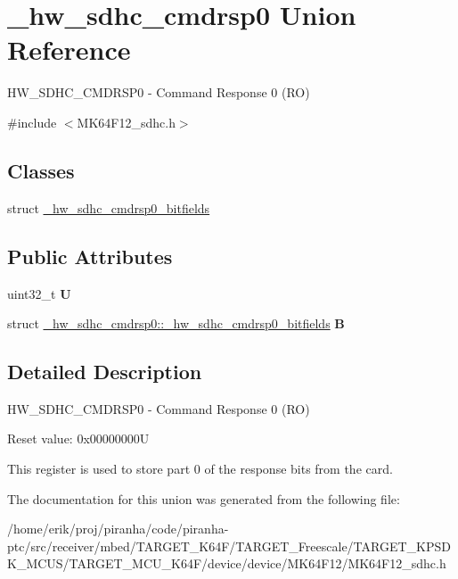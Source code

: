 \hypertarget{union__hw__sdhc__cmdrsp0}{}\section{\+\_\+hw\+\_\+sdhc\+\_\+cmdrsp0 Union Reference}
\label{union__hw__sdhc__cmdrsp0}


H\+W\+\_\+\+S\+D\+H\+C\+\_\+\+C\+M\+D\+R\+S\+P0 -\/ Command Response 0 (RO)  




{\ttfamily \#include $<$M\+K64\+F12\+\_\+sdhc.\+h$>$}

\subsection*{Classes}
\begin{DoxyCompactItemize}
\item 
struct \hyperlink{struct__hw__sdhc__cmdrsp0_1_1__hw__sdhc__cmdrsp0__bitfields}{\+\_\+hw\+\_\+sdhc\+\_\+cmdrsp0\+\_\+bitfields}
\end{DoxyCompactItemize}
\subsection*{Public Attributes}
\begin{DoxyCompactItemize}
\item 
uint32\+\_\+t {\bfseries U}\hypertarget{union__hw__sdhc__cmdrsp0_ab269572c075d2eea232217ff0bcc87f8}{}\label{union__hw__sdhc__cmdrsp0_ab269572c075d2eea232217ff0bcc87f8}

\item 
struct \hyperlink{struct__hw__sdhc__cmdrsp0_1_1__hw__sdhc__cmdrsp0__bitfields}{\+\_\+hw\+\_\+sdhc\+\_\+cmdrsp0\+::\+\_\+hw\+\_\+sdhc\+\_\+cmdrsp0\+\_\+bitfields} {\bfseries B}\hypertarget{union__hw__sdhc__cmdrsp0_a39e55bdcc375ad51350484762b3e71a4}{}\label{union__hw__sdhc__cmdrsp0_a39e55bdcc375ad51350484762b3e71a4}

\end{DoxyCompactItemize}


\subsection{Detailed Description}
H\+W\+\_\+\+S\+D\+H\+C\+\_\+\+C\+M\+D\+R\+S\+P0 -\/ Command Response 0 (RO) 

Reset value\+: 0x00000000U

This register is used to store part 0 of the response bits from the card. 

The documentation for this union was generated from the following file\+:\begin{DoxyCompactItemize}
\item 
/home/erik/proj/piranha/code/piranha-\/ptc/src/receiver/mbed/\+T\+A\+R\+G\+E\+T\+\_\+\+K64\+F/\+T\+A\+R\+G\+E\+T\+\_\+\+Freescale/\+T\+A\+R\+G\+E\+T\+\_\+\+K\+P\+S\+D\+K\+\_\+\+M\+C\+U\+S/\+T\+A\+R\+G\+E\+T\+\_\+\+M\+C\+U\+\_\+\+K64\+F/device/device/\+M\+K64\+F12/M\+K64\+F12\+\_\+sdhc.\+h\end{DoxyCompactItemize}

